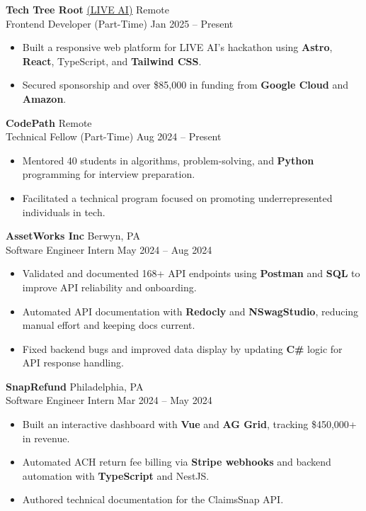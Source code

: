 \documentclass[10pt]{article}
\newcommand{\tightitems}{\vspace{-5pt}}
\begin{document}
\textbf{\normalsize Tech Tree Root} \href{https://liveaiglobal.com/}{(LIVE AI)} \hfill Remote \\
{Frontend Developer (Part-Time)} \hfill Jan 2025 -- Present
\tightitems
\begin{itemize}[leftmargin=2em]
    \item Built a responsive web platform for LIVE AI's hackathon using \textbf{Astro}, \textbf{React}, TypeScript, and \textbf{Tailwind CSS}.
    \item Secured sponsorship and over \$85,000 in funding from \textbf{Google Cloud} and \textbf{Amazon}.
\end{itemize}


\textbf{\normalsize CodePath} \hfill Remote \\
{Technical Fellow (Part-Time)} \hfill Aug 2024 -- Present
\tightitems
\begin{itemize}[leftmargin=2em]
    \item Mentored 40 students in algorithms, problem-solving, and \textbf{Python} programming for interview preparation.
    \item Facilitated a technical program focused on promoting underrepresented individuals in tech.
\end{itemize}


\textbf{\normalsize AssetWorks Inc} \hfill Berwyn, PA \\
{Software Engineer Intern} \hfill May 2024 -- Aug 2024
\tightitems
\begin{itemize}[leftmargin=2em]
    \item Validated and documented 168+ API endpoints using \textbf{Postman} and \textbf{SQL} to improve API reliability and onboarding.
    \item Automated API documentation with \textbf{Redocly} and \textbf{NSwagStudio}, reducing manual effort and keeping docs current.
    \item Fixed backend bugs and improved data display by updating \textbf{C\#} logic for API response handling.
\end{itemize}


\textbf{\normalsize SnapRefund} \hfill Philadelphia, PA \\
{Software Engineer Intern} \hfill Mar 2024 -- May 2024
\tightitems
\begin{itemize}[leftmargin=2em]
    \item Built an interactive dashboard with \textbf{Vue} and \textbf{AG Grid}, tracking \$450,000+ in revenue.
    \item Automated ACH return fee billing via \textbf{Stripe webhooks} and backend automation with \textbf{TypeScript} and NestJS.
    \item Authored technical documentation for the ClaimsSnap API.
\end{itemize}
\end{document}
